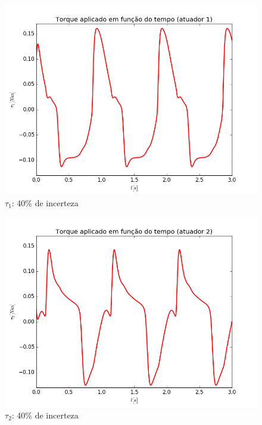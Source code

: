 \documentclass[]{politex}
\begin{document}
\begin{multicols}{2}
\begin{figure}[H]
	\centering
	\includegraphics[scale=0.42]{imagens/40/tau1.png}  
	\caption{$\tau_1$: 40\% de incerteza}
	\label{fig:Torque1_40}
\end{figure}
\begin{figure}[H]
	\centering
	\includegraphics[scale=0.42]{imagens/40/tau2.png}  
	\caption{$\tau_2$: 40\% de incerteza}
	\label{fig:Torque2_40}
\end{figure}
\end{multicols}  

\newpage
\end{document}
